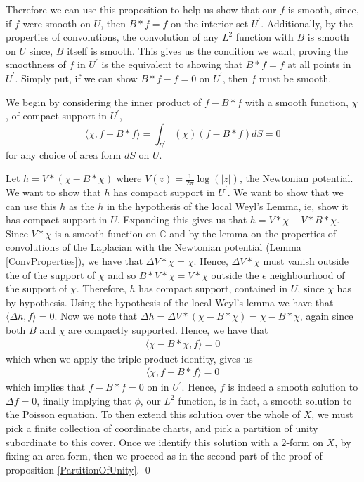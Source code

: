 \documentclass[11pt]{report}
\theoremstyle{definition}
\begin{document}
Therefore we can use this proposition to help us show that our $f$ is smooth, since, if $f$ were smooth on $U$, then $B*f = f$ on the interior set $U^{\prime}$. Additionally, by the properties of convolutions, the convolution of any $L^2$ function with $B$ is smooth on $U$ since, $B$ itself is smooth. This gives us the condition we want; proving the smoothness of $f$ in $U^{\prime}$ is the equivalent to showing that $B*f = f$ at all points in $U^{\prime}$. Simply put, if we can show $B*f - f = 0$ on $U^{\prime}$, then $f$ must be smooth. 

We begin by considering the inner product of $f-B*f$ with a smooth function, $\chi$, of compact support in $U^{\prime}$, \[\langle \chi, f-B*f\rangle = \int_{U^{\prime}} (\chi)(f-B*f)dS = 0 \] for any choice of area form $dS$ on $U$. 

Let $h = V*(\chi-B*\chi)$ where $V(z) = \frac{1}{2\pi}\log(|z|)$, the Newtonian potential. We want to show that $h$ has compact support in $U^{\prime}$. We want to show that we can use this $h$ as the $h$ in the hypothesis of the local Weyl's Lemma, ie, show it has compact support in $U$. Expanding this gives us that $h = V*\chi - V*B*\chi$. Since $V*\chi$ is a smooth function on $\mathbb{C}$ and by the lemma on the properties of convolutions of the Laplacian with the Newtonian potential (Lemma \ref{ConvProperties}), we have that $\Delta V*\chi = \chi$. Hence, $\Delta V*\chi$ must vanish outside the of the support of $\chi$ and so $B*V*\chi = V*\chi$ outside the $\epsilon$ neighbourhood of the support of $\chi$. Therefore, $h$ has compact support, contained in $U$, since $\chi$ has by hypothesis. Using the hypothesis of the local Weyl's lemma we have that $\langle \Delta h, f\rangle = 0$. Now we note that $\Delta h = \Delta V*(\chi - B*\chi) = \chi - B*\chi$, again since both $B$ and $\chi$ are compactly supported. Hence, we have that 
\begin{align*}
  \langle \chi - B*\chi, f \rangle = 0 
\end{align*}
which when we apply the triple product identity, gives us 
\begin{align*}
  \langle \chi, f - B*f \rangle = 0 
\end{align*}
which implies that $f-B*f = 0$ on in $U^{\prime}$. Hence, $f$ is indeed a smooth solution to $\Delta f = 0$, finally implying that $\phi$, our $L^2$ function, is in fact, a smooth solution to the Poisson equation.
To then extend this solution over the whole of $X$, we must pick a finite collection of coordinate charts, and pick a partition of unity subordinate to this cover. Once we identify this solution with a $2$-form on $X$, by fixing an area form, then we proceed as in the second part of the proof of proposition \ref{PartitionOfUnity}. \qed
\end{document}
